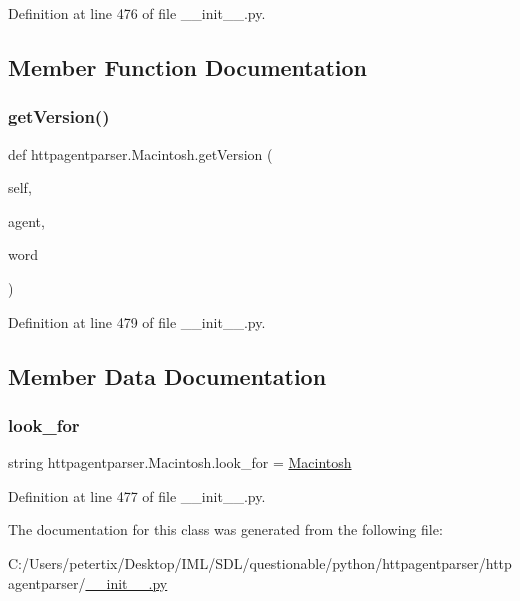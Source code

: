 Definition at line 476 of file \+\_\+\+\_\+init\+\_\+\+\_\+.\+py.



\subsection{Member Function Documentation}
\hypertarget{classhttpagentparser_1_1_macintosh_a463a7e6d038417b6594e02726a49ae5e}{}\label{classhttpagentparser_1_1_macintosh_a463a7e6d038417b6594e02726a49ae5e} 
\subsubsection{\texorpdfstring{get\+Version()}{getVersion()}}
{\footnotesize\ttfamily def httpagentparser.\+Macintosh.\+get\+Version (\begin{DoxyParamCaption}\item[{}]{self,  }\item[{}]{agent,  }\item[{}]{word }\end{DoxyParamCaption})}



Definition at line 479 of file \+\_\+\+\_\+init\+\_\+\+\_\+.\+py.



\subsection{Member Data Documentation}
\hypertarget{classhttpagentparser_1_1_macintosh_a6604bdab4a52842bf843cfaf1de2a0ba}{}\label{classhttpagentparser_1_1_macintosh_a6604bdab4a52842bf843cfaf1de2a0ba} 
\subsubsection{\texorpdfstring{look\+\_\+for}{look\_for}}
{\footnotesize\ttfamily string httpagentparser.\+Macintosh.\+look\+\_\+for = \textquotesingle{}\hyperlink{classhttpagentparser_1_1_macintosh}{Macintosh}\textquotesingle{}\hspace{0.3cm}{\ttfamily [static]}}



Definition at line 477 of file \+\_\+\+\_\+init\+\_\+\+\_\+.\+py.



The documentation for this class was generated from the following file\+:\begin{DoxyCompactItemize}
\item 
C\+:/\+Users/petertix/\+Desktop/\+I\+M\+L/\+S\+D\+L/questionable/python/httpagentparser/httpagentparser/\hyperlink{____init_____8py}{\+\_\+\+\_\+init\+\_\+\+\_\+.\+py}\end{DoxyCompactItemize}
